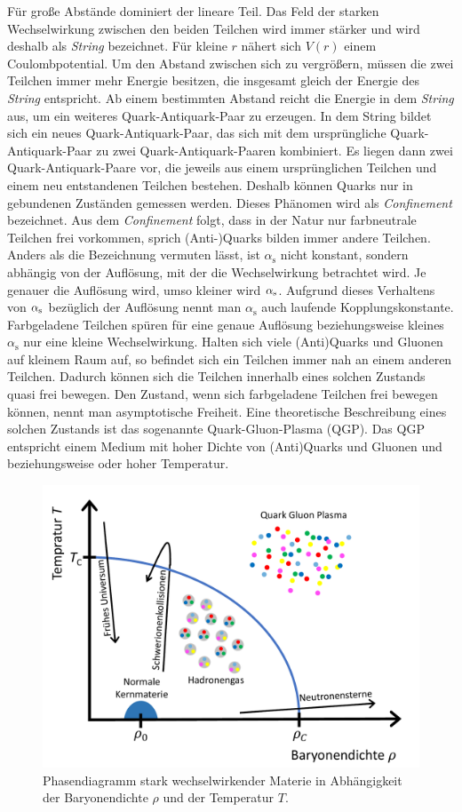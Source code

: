 Für große Abstände dominiert der lineare Teil.
Das Feld der starken Wechselwirkung zwischen den beiden Teilchen wird immer stärker und wird deshalb als \textit{String} bezeichnet.
Für kleine $r$ nähert sich $V(r)$ einem Coulombpotential.
\newline
Um den Abstand zwischen sich zu vergrößern, müssen die zwei Teilchen immer mehr Energie besitzen, die insgesamt gleich der Energie des \textit{String} entspricht.
Ab einem bestimmten Abstand reicht die Energie in dem \textit{String} aus, um ein weiteres Quark-Antiquark-Paar zu erzeugen.
In dem String bildet sich ein neues Quark-Antiquark-Paar, das sich mit dem ursprüngliche Quark-Antiquark-Paar zu zwei Quark-Antiquark-Paaren kombiniert.
Es liegen dann zwei Quark-Antiquark-Paare vor, die jeweils aus einem ursprünglichen Teilchen und einem neu entstandenen Teilchen bestehen.
Deshalb können Quarks nur in gebundenen Zuständen gemessen werden.
Dieses Phänomen wird als \textit{Confinement} bezeichnet.
Aus dem \textit{Confinement} folgt, dass in der Natur nur farbneutrale Teilchen frei vorkommen, sprich (Anti-)Quarks bilden immer andere Teilchen.%
\newline
Anders als die Bezeichnung vermuten lässt, ist $\alpha_\text{s}$ nicht konstant, sondern abhängig von der Auf\-lö\-sung, mit der die Wechselwirkung betrachtet wird.
Je genauer die Auflösung wird, umso kleiner wird $\alpha_{\rm{s}}$.
Aufgrund dieses Verhaltens von $\alpha_{\rm{s}}$ bezüglich der Auflösung nennt man $\alpha_\text{s}$ auch laufende Kopplungskonstante.
Farbgeladene Teilchen spüren für eine genaue Auflösung beziehungsweise kleines $\alpha_\text{s}$ nur eine kleine Wechselwirkung.
Halten sich viele (Anti)Quarks und Gluonen auf kleinem Raum auf, so befindet sich ein Teilchen immer nah an einem anderen Teilchen.
Dadurch können sich die Teilchen innerhalb eines solchen Zustands quasi frei bewegen.
Den Zustand, wenn sich farbgeladene Teilchen frei bewegen können, nennt man asymptotische Freiheit.
\newline
Eine theoretische Beschreibung eines solchen Zustands ist das sogenannte Quark-Gluon-Plasma (QGP).
Das QGP entspricht einem Medium mit hoher Dichte von (Anti)Quarks und Gluonen und beziehungsweise oder hoher Temperatur.
\begin{figure}[tp]
\centering
\includegraphics[width=.6\linewidth]{QCD_phase_diagram.pdf}
\caption{Phasendiagramm stark wechselwirkender Materie in Abhängigkeit der Baryonendichte $\rho$ und der Temperatur $T$.
\cite{Thesis:Tim}}
\label{fig:QGPPhase}
\end{figure}
